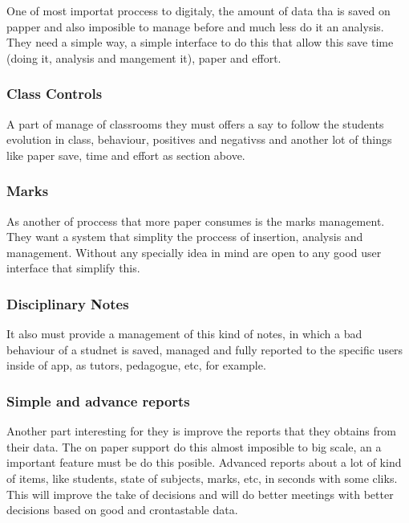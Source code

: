 One of most importat proccess to digitaly, the amount of data tha is saved on papper and also imposible to manage before and much less do it an analysis.
They need a simple way, a simple interface to do this that allow this save time (doing it, analysis and mangement it), paper and effort.


\bigskip
\subsubsection{Class Controls}
\bigskip

A part of manage of classrooms they must offers a say to follow the students evolution in class, behaviour, positives and negativss and another lot of things like paper save, time and effort as section above.

\bigskip
\subsubsection{Marks} %
\bigskip

As another of proccess that more paper consumes is the marks management. They want a system that simplity the proccess of insertion, analysis and management. Without any specially idea in mind are open to any good user interface that simplify this.


\bigskip
\subsubsection{Disciplinary Notes}
\bigskip

It also must provide a management of this kind of notes, in which a bad behaviour of a studnet is saved, managed and fully reported to the specific users inside of app, as tutors, pedagogue, etc, for example.

\bigskip
\subsubsection{Simple and advance reports}
\bigskip

Another part interesting for they is improve the reports that they obtains from their data. The on paper support do this almost imposible to big scale, an a important feature must be do this posible. Advanced reports about a lot of kind of items, like students, state of subjects, marks, etc, in seconds with some cliks.
This will improve the take of decisions and will do better meetings with better decisions based on good and crontastable data.

